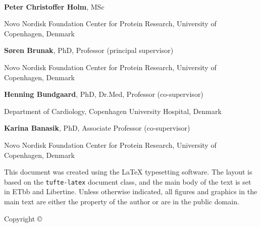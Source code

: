 \begin{@empty}
~\vfill
\thispagestyle{empty}
\setlength{\parindent}{0pt}
\setlength{\parskip}{\baselineskip}


\textbf{Peter Christoffer Holm}, MSc

Novo Nordisk Foundation Center for Protein Research,
University of Copenhagen, Denmark


\textbf{Søren Brunak}, PhD, Professor 
(principal supervisor)

Novo Nordisk Foundation Center for Protein Research, 
University of Copenhagen, Denmark

\textbf{Henning Bundgaard}, PhD, Dr.Med, Professor 
(co-supervisor)

Department of Cardiology,
Copenhagen University Hospital, Denmark

\textbf{Karina Banasik}, PhD, Associate Professor 
(co-supervisor)

Novo Nordisk Foundation Center for Protein Research, 
University of Copenhagen, Denmark

\vspace{2em}

\par{}

\vspace{5em}

\par This document was created using the \LaTeX{} typesetting software.
The layout is based on the \texttt{tufte-latex} document class,
and the main body of the text is set in \textsf{ETbb} and \textsf{Libertine}.
Unless otherwise indicated, all figures and graphics in the main text
are either the property of the author or are in the public domain.


Copyright \copyright\ \the\year\ \thanklessauthor
\end{@empty}
